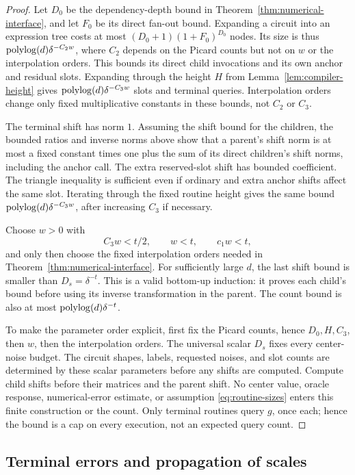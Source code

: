 \begin{proof}
Let $D_0$ be the dependency-depth bound in
Theorem~\ref{thm:numerical-interface}, and let $F_0$ be its direct
fan-out bound.  Expanding a circuit into an expression tree costs
at most $(D_0+1)(1+F_0)^{D_0}$ nodes.  Its size is thus
$\operatorname{polylog}(d)\delta^{-C_2w}$, where $C_2$ depends on the Picard
counts but not on $w$ or the interpolation orders.  This bounds its
direct child invocations and its own anchor and residual slots.
Expanding through the height $H$ from
Lemma~\ref{lem:compiler-height} gives
$\operatorname{polylog}(d)\delta^{-C_3w}$ slots and terminal queries.
Interpolation orders change only fixed multiplicative constants in
these bounds, not $C_2$ or $C_3$.

The terminal shift has norm $1$.  Assuming the shift bound for the
children, the bounded ratios and inverse norms above show that a
parent's shift norm is at most a fixed constant times one plus the
sum of its direct children's shift norms, including the anchor
call.  The extra reserved-slot shift has bounded coefficient.
The triangle inequality is sufficient even if ordinary and extra
anchor shifts affect the same slot.  Iterating through the fixed
routine height gives the same bound
$\operatorname{polylog}(d)\delta^{-C_3w}$, after increasing $C_3$ if necessary.

Choose $w>0$ with
\[
 C_3w<t/2,\qquad w<t,\qquad c_1w<t,
\]
and only then choose the fixed interpolation orders needed in
Theorem~\ref{thm:numerical-interface}.  For sufficiently large $d$, the last
shift bound is smaller than $D_s=\delta^{-t}$.  This is a valid
bottom-up induction: it proves each child's bound before using its
inverse transformation in the parent.  The count bound is also at
most $\operatorname{polylog}(d)\delta^{-t}$.

To make the parameter order explicit, first fix the Picard counts,
hence $D_0,H,C_3$, then $w$, then the interpolation orders.  The
universal scalar $D_s$ fixes every center-noise budget.  The circuit
shapes, labels, requested noises, and slot counts are determined by
these scalar parameters before any shifts are computed.  Compute
child shifts before their matrices and the parent shift.  No center
value, oracle response, numerical-error estimate, or assumption
\eqref{eq:routine-sizes} enters this finite construction or the
count.  Only terminal routines query $g$, once each; hence the bound
is a cap on every execution, not an expected query count.
\end{proof}

\subsection{Terminal errors and propagation of scales}

